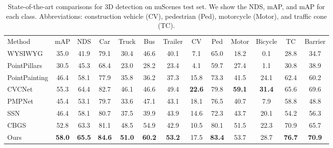 \documentclass[final]{cvpr}
\begin{document}
\begin{table*}[t]
\centering 
\begin{tabular}{l@{\ \ \ }c@{\ \ \ }c@{\ \ \ }c@{\ \ \ }c@{\ \ \ }c@{\ \ \ }c@{\ \ \ }c@{\ \ \ }c@{\ \ \ }c@{\ \ \ }c@{\ \ \ }c@{\ \ \ }c}
  \toprule 
  Method & mAP & NDS & Car & Truck & Bus & Trailer & CV & Ped & Motor & Bicycle & TC & Barrier \\ 
 \cmidrule(r){1-1}
 \cmidrule(r){2-3}
 \cmidrule(){4-13}
  WYSIWYG \cite{hu2019exploiting} & 35.0 & 41.9 & 79.1 & 30.4 & 46.6 & 40.1 & 7.1 & 65.0 & 18.2 & 0.1 & 28.8 & 34.7\\ 
  PointPillars \cite{pillar} & 30.5 & 45.3 & 68.4 & 23.0 & 28.2 & 23.4 & 4.1 & 59.7 & 27.4 & 1.1 & 30.8 & 38.9\\ 
  PointPainting \cite{vora2019pointpainting} & 46.4 & 58.1 & 77.9 & 35.8 & 36.2 & 37.3 & 15.8 & 73.3 & 41.5 & 24.1 & 62.4 & 60.2\\ 
  CVCNet \cite{chen2020view} & 55.3 & 64.4 & 82.7 & 46.1 & 46.6 & 49.4 & \textbf{22.6} & 79.8 & \textbf{59.1} & \textbf{31.4} & 65.6 & 69.6 \\ 
  PMPNet \cite{yin2020Lidarbased} & 45.4 & 53.1 & 79.7 & 33.6 & 47.1 & 43.1 & 18.1 & 76.5 & 40.7 & 7.9 & 58.8 & 48.8\\ 
  SSN \cite{zhu2020ssn} & 46.4 & 58.1 & 80.7 & 37.5 & 39.9 & 43.9 & 14.6 & 72.3 & 43.7& 20.1 & 54.2 & 56.3 \\ 
  CBGS \cite{zhu2019classbalanced} & 52.8 & 63.3 & 81.1 & 48.5 & 54.9 & 42.9 & 10.5 & 80.1 & 51.5 & 22.3 & 70.9 & 65.7\\ 
  Ours & \textbf{58.0} & \textbf{65.5} & \textbf{84.6} & \textbf{51.0} & \textbf{60.2} & \textbf{53.2} & 17.5 & \textbf{83.4} & 53.7 & 28.7 & \textbf{76.7} & \textbf{70.9} \\  
  \bottomrule
 \end{tabular}
\caption{State-of-the-art comparisons for 3D detection on nuScenes test set. We show the NDS, mAP, and mAP for each class. Abbreviations: construction vehicle (CV), pedestrian (Ped), motorcycle (Motor), and traffic cone (TC).}
\end{table*}
\end{document}
